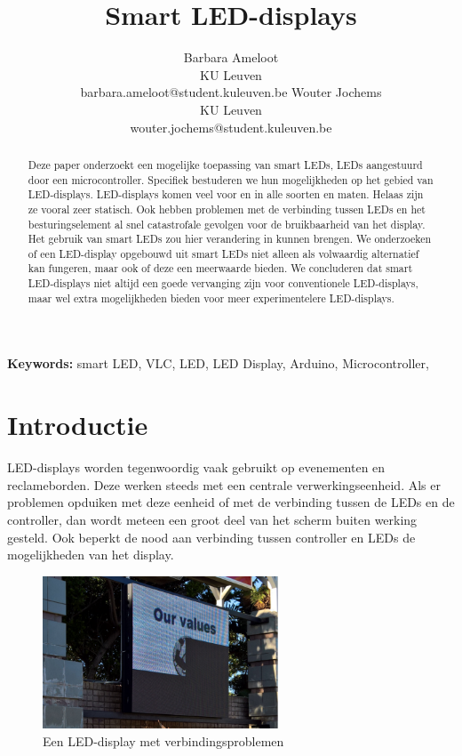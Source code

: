 \documentclass{article}
\title{Smart LED-displays}
\author{Barbara Ameloot\\
KU Leuven\\
barbara.ameloot@student.kuleuven.be
\And 
Wouter Jochems\\
KU Leuven\\
wouter.jochems@student.kuleuven.be}
\begin{document}
\maketitle

\begin{abstract}
Deze paper onderzoekt een mogelijke toepassing van smart LEDs, LEDs aangestuurd door een microcontroller\cite{smartLED}. Specifiek bestuderen we hun mogelijkheden op het gebied van LED-displays. LED-displays komen veel voor en in alle soorten en maten. Helaas zijn ze vooral zeer statisch. Ook hebben problemen met de verbinding tussen LEDs en het besturingselement al snel catastrofale gevolgen voor de bruikbaarheid van het display. Het gebruik van smart LEDs zou hier verandering in kunnen brengen. We onderzoeken of een LED-display opgebouwd uit smart LEDs niet alleen als volwaardig alternatief kan fungeren, maar ook of deze een meerwaarde bieden. We concluderen dat smart LED-displays niet altijd een goede vervanging zijn voor conventionele LED-displays, maar wel extra mogelijkheden bieden voor meer experimentelere LED-displays.
\end{abstract}

{\bf Keywords:} smart LED, VLC, LED, LED Display, Arduino, Microcontroller,


\section{Introductie}

LED-displays worden tegenwoordig vaak gebruikt op evenementen en reclameborden. Deze werken steeds met een centrale verwerkingseenheid. Als er problemen opduiken met deze eenheid of met de verbinding tussen de LEDs en de controller, dan wordt meteen een groot deel van het scherm buiten werking gesteld\cite{brokenDisplay}. Ook beperkt de nood aan verbinding tussen controller en LEDs de mogelijkheden van het display. 
\begin{figure}
\centering
\includegraphics[width=7cm]{broken.png}
\caption{Een LED-display met verbindingsproblemen}
\end{figure}
\end{document}
